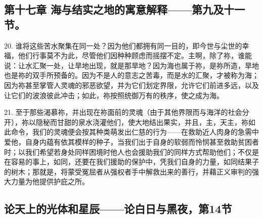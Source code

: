 
\subsection{第十七章 海与结实之地的寓意解释——第九及十一节。}

20. 谁将这些苦水聚集在同一处？因为他们都拥有同一目的，即今世与尘世的幸福，他们行事莫不为此，尽管他们因种种顾虑而摇摆不定。主啊，除了祢，谁能说：让水汇聚一处，让旱地出现，就是那旱地？因为海也属于祢，是祢所造，旱地也是祢的双手所预备的。因为不是人的意志之苦毒，而是水的汇聚，才被称为海；因为祢甚至掌管人灵魂的邪恶欲望，并为它们划定界限，允许它们前进多远，以及让它们的波浪彼此冲击；如此，祢按照统御万有的秩序，使之成为海。\par

21. 至于那些渴慕祢，并出现在祢面前的灵魂（由于其他界限而与海洋的社会分开），祢以隐秘而甘甜的泉水浇灌他们，使大地结出果实，并且，主，天主，祢如此命令，我们的灵魂便会按其种类萌发出仁慈的行为——在救助近人肉身的急需中爱他，自身内蕴有依其模样的种子，当我们出于自身的软弱而怜悯甚至救助贫困者时；以我们希望若身处同样困境时他人也会援助我们的同样方式帮助他们；不仅是在容易的事上，如同，还要在我们援助的保护中，凭我们自身的力量，如同结果子的树木；那就是，将蒙受冤屈者从强权者手中解救出来的善行，并藉正义审判的强大力量为他提供护庇之所。\par


\subsection{论天上的光体和星辰——论白日与黑夜，第14节}

